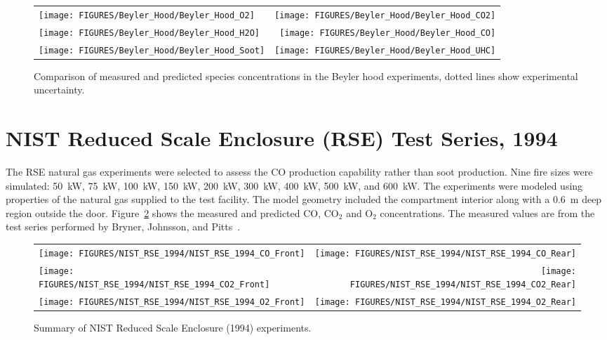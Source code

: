 \newpage

\begin{figure}[p]
\begin{tabular*}{\textwidth}{l@{\extracolsep{\fill}}r}
\texttt{[image: FIGURES/Beyler\_Hood/Beyler\_Hood\_O2]} &
\texttt{[image: FIGURES/Beyler\_Hood/Beyler\_Hood\_CO2]} \\
\texttt{[image: FIGURES/Beyler\_Hood/Beyler\_Hood\_H2O]} &
\texttt{[image: FIGURES/Beyler\_Hood/Beyler\_Hood\_CO]} \\
\texttt{[image: FIGURES/Beyler\_Hood/Beyler\_Hood\_Soot]} &
\texttt{[image: FIGURES/Beyler\_Hood/Beyler\_Hood\_UHC]} \\
\end{tabular*}
\caption[Summary of gas species predictions, Beyler hood experiments.]
{Comparison of measured and predicted species concentrations in the Beyler hood experiments,
dotted lines show experimental uncertainty.}
\label{Beyler_Species}
\end{figure}

\clearpage

\section{NIST Reduced Scale Enclosure (RSE) Test Series, 1994}

The RSE natural gas experiments were selected to assess the CO production capability rather than soot production.
Nine fire sizes were simulated: 50~kW, 75~kW, 100~kW, 150~kW, 200~kW, 300~kW, 400~kW,
500~kW, and 600~kW.  The experiments were modeled using properties of the natural gas supplied to the test facility.
The model geometry included the compartment interior along with a 0.6~m deep region outside the door.
Figure~\ref{NIST_RSE_1994} shows the measured and predicted CO, CO$_2$ and O$_2$ concentrations.  The measured values are
from the test series performed by Bryner, Johnsson, and Pitts~\cite{Bryner:1}.

\newpage

\begin{figure}[p]
\begin{tabular*}{\textwidth}{l@{\extracolsep{\fill}}r}
\texttt{[image: FIGURES/NIST\_RSE\_1994/NIST\_RSE\_1994\_CO\_Front]} &
\texttt{[image: FIGURES/NIST\_RSE\_1994/NIST\_RSE\_1994\_CO\_Rear]} \\
\texttt{[image: FIGURES/NIST\_RSE\_1994/NIST\_RSE\_1994\_CO2\_Front]} &
\texttt{[image: FIGURES/NIST\_RSE\_1994/NIST\_RSE\_1994\_CO2\_Rear]} \\
\texttt{[image: FIGURES/NIST\_RSE\_1994/NIST\_RSE\_1994\_O2\_Front]} &
\texttt{[image: FIGURES/NIST\_RSE\_1994/NIST\_RSE\_1994\_O2\_Rear]}
\end{tabular*}
\caption[Summary of NIST Reduced Scale Enclosure (1994) experiments.]{Summary of NIST Reduced Scale Enclosure (1994) experiments.}
\label{NIST_RSE_1994}
\end{figure}



